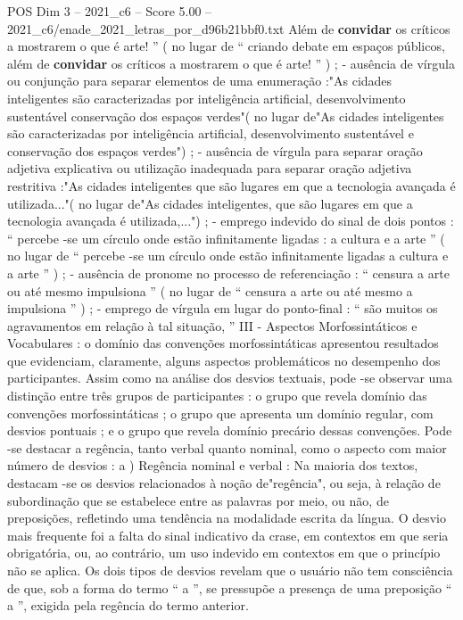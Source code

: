 \begin{textsample}{POS Dim 3 – 2021\_c6 – Score 5.00 – 2021\_c6/enade\_2021\_letras\_por\_d96b21bbf0.txt}
Além de \textbf{convidar} os críticos a mostrarem o que é arte! ” ( no lugar de “ criando debate em espaços públicos, além de \textbf{convidar} os críticos a mostrarem o que é arte! ” ) ; - ausência de vírgula ou conjunção para separar elementos de uma enumeração :"As cidades inteligentes são caracterizadas por inteligência artificial, desenvolvimento sustentável conservação dos espaços verdes"( no lugar de"As cidades inteligentes são caracterizadas por inteligência artificial, desenvolvimento sustentável e conservação dos espaços verdes") ; - ausência de vírgula para separar oração adjetiva explicativa ou utilização inadequada para separar oração adjetiva restritiva :"As cidades inteligentes que são lugares em que a tecnologia avançada é utilizada..."( no lugar de"As cidades inteligentes, que são lugares em que a tecnologia avançada é utilizada,...") ; - emprego indevido do sinal de dois pontos : “ percebe -se um círculo onde estão infinitamente ligadas : a cultura e a arte ” ( no lugar de “ percebe -se um círculo onde estão infinitamente ligadas a cultura e a arte ” ) ; - ausência de pronome no processo de referenciação : “ censura a arte ou até mesmo impulsiona ” ( no lugar de “ censura a arte ou até mesmo a impulsiona ” ) ; - emprego de vírgula em lugar do ponto-final : “ são muitos os agravamentos em relação à tal situação, ” III - Aspectos Morfossintáticos e Vocabulares : o domínio das convenções morfossintáticas apresentou resultados que evidenciam, claramente, alguns aspectos problemáticos no desempenho dos participantes.
Assim como na análise dos desvios textuais, pode -se observar uma distinção entre três grupos de participantes : o grupo que revela domínio das convenções morfossintáticas ; o grupo que apresenta um domínio regular, com desvios pontuais ; e o grupo que revela domínio precário dessas convenções.
Pode -se destacar a regência, tanto verbal quanto nominal, como o aspecto com maior número de desvios : a ) Regência nominal e verbal : Na maioria dos textos, destacam -se os desvios relacionados à noção de"regência", ou seja, à relação de subordinação que se estabelece entre as palavras por meio, ou não, de preposições, refletindo uma tendência na modalidade escrita da língua.
O desvio mais frequente foi a falta do sinal indicativo da crase, em contextos em que seria obrigatória, ou, ao contrário, um uso indevido em contextos em que o princípio não se aplica.
Os dois tipos de desvios revelam que o usuário não tem consciência de que, sob a forma do termo “ a ”, se pressupõe a presença de uma preposição “ a ”, exigida pela regência do termo anterior.

\end{textsample}
